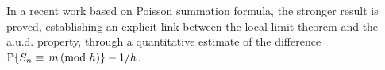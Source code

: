 \documentclass[11pt,draft,reqno]{amsart}
\theoremstyle{definition}
\theoremstyle{remarks}
\numberwithin{equation}{section}
\def \m{{\mu}}
\def \s{{\sigma}}
\begin{document}
  

 

   \vskip 10pt     In a recent work     based on   Poisson summation formula, 
the stronger result    is proved,  establishing an explicit link between the local limit theorem and  the a.u.d. property, through a     quantitative   estimate of  the difference ${\mathbb P} \{ S_n\equiv\,  m\! \hbox{\rm{ (mod $h$)}} \}- {1}/{h}$. 
\end{document}
